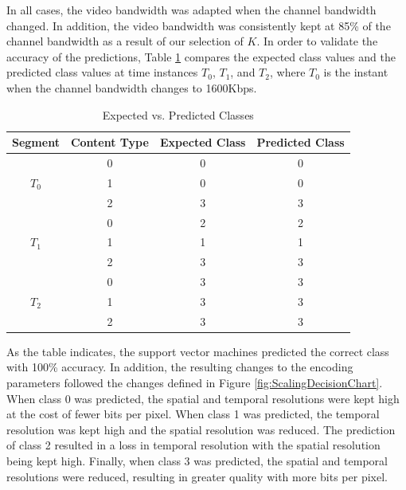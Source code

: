 In all cases, the video bandwidth was adapted when the channel bandwidth changed. In addition, the video bandwidth was consistently kept at 85\% of the channel bandwidth as a result of our selection of $K$. In order to validate the accuracy of the predictions, Table \ref{tab:PredictedClasses} compares the expected class values and the predicted class values at time instances $T_0$, $T_1$, and $T_2$, where $T_0$ is the instant when the channel bandwidth changes to 1600Kbps.
\begin{table} [H]
\centering
\caption{Expected vs. Predicted Classes}
\label{tab:PredictedClasses}
\begin{tabular}{c|c|c|c}
\textbf{Segment}&\textbf{Content Type}&\textbf{Expected Class}&\textbf{Predicted Class}\\
\hline
&0&0&0\\
$T_0$&1&0&0\\
&2&3&3\\
\hline
&0&2&2\\
$T_1$&1&1&1\\
&2&3&3\\
\hline
&0&3&3\\
$T_2$&1&3&3\\
&2&3&3\\
\end{tabular}
\end{table} 
As the table indicates, the support vector machines predicted the correct class with 100\% accuracy. In addition, the resulting changes to the encoding parameters followed the changes defined in Figure \ref{fig:ScalingDecisionChart}. When class 0 was predicted, the spatial and temporal resolutions were kept high at the cost of fewer bits per pixel. When class 1 was predicted, the temporal resolution was kept high and the spatial resolution was reduced. The prediction of class 2 resulted in a loss in temporal resolution with the spatial resolution being kept high. Finally, when class 3 was predicted, the spatial and temporal resolutions were reduced, resulting in greater quality with more bits per pixel. 

